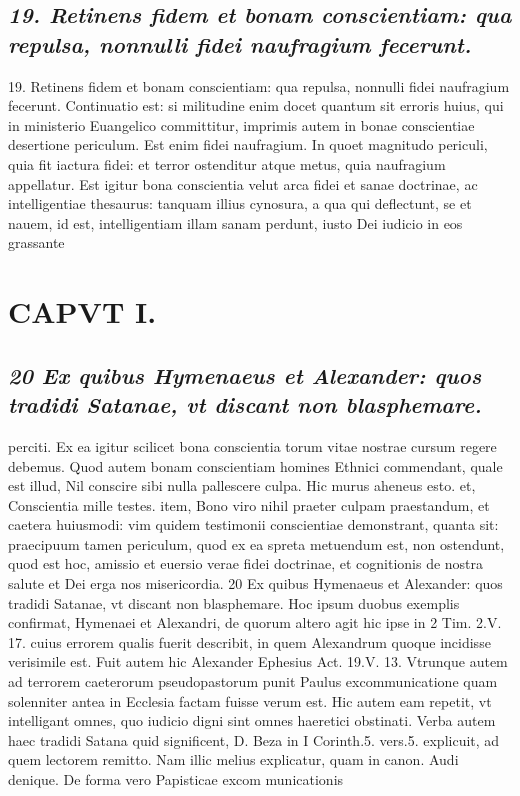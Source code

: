 \documentclass{article}
\begin{document}
\begin{pages}
\subsection*{\textit{19. Retinens fidem et bonam conscientiam: qua repulsa, nonnulli fidei naufragium fecerunt.}}19. Retinens fidem et bonam conscientiam: qua repulsa, nonnulli fidei naufragium fecerunt.  \pend\pstart Continuatio est: si militudine enim docet quantum sit erroris huius, qui in ministerio Euangelico committitur, imprimis autem in bonae conscientiae desertione periculum. Est enim fidei naufragium. In quoet magnitudo periculi, quia fit iactura fidei: et terror ostenditur atque metus, quia naufragium appellatur. Est igitur bona conscientia velut arca fidei et sanae doctrinae, ac intelligentiae thesaurus: tanquam illius cynosura, a qua qui deflectunt, se et nauem, id est, intelligentiam illam sanam perdunt, iusto Dei iudicio in eos grassante  \pend
\section*{CAPVT  I. }
\marginpar{[ p.37 ]}\pstart {}
{}
\subsection*{\textit{20 Ex quibus Hymenaeus et Alexander: quos tradidi Satanae, vt discant non blasphemare.}}perciti. Ex ea igitur scilicet bona conscientia torum vitae nostrae cursum regere debemus. Quod autem bonam conscientiam homines Ethnici commendant, quale est illud, Nil conscire sibi nulla pallescere culpa. Hic murus aheneus esto. et, Conscientia mille testes. item, Bono viro nihil praeter culpam praestandum, et caetera huiusmodi: vim quidem testimonii conscientiae demonstrant, quanta sit: praecipuum tamen periculum, quod ex ea spreta metuendum est, non ostendunt, quod est hoc, amissio et euersio verae fidei doctrinae, et cognitionis de nostra salute et Dei erga nos misericordia. 20 Ex quibus Hymenaeus et Alexander: quos tradidi Satanae, vt discant non blasphemare. Hoc ipsum duobus exemplis confirmat, Hymenaei et Alexandri, de quorum altero agit hic ipse in 2 Tim. 2.V. 17. cuius errorem qualis fuerit describit, in quem Alexandrum quoque incidisse verisimile est. Fuit autem hic Alexander Ephesius Act. 19.V. 13. Vtrunque autem ad terrorem caeterorum pseudopastorum punit Paulus excommunicatione quam solenniter antea in Ecclesia factam fuisse verum est. Hic autem eam repetit, vt intelligant omnes, quo iudicio digni sint omnes haeretici obstinati. Verba autem haec tradidi Satana quid significent, D. Beza in I Corinth.5. vers.5. explicuit, ad quem lectorem remitto. Nam illic melius explicatur, quam in canon. Audi denique. De forma vero Papisticae excom municationis  \pend
\endnumbering

\end{pages}
\end{document}

